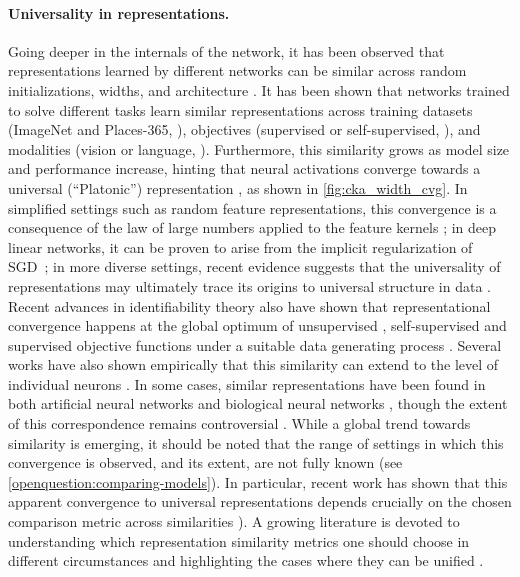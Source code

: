 \paragraph{Universality in representations.} Going deeper in the internals of the network, it has been observed that representations learned by different networks can be similar across random initializations, widths, and architecture \citep{raghu2017svcca,kornblith2019similarity,bansal2021revisiting,huh2024platonic, moschella2022relative}. It has been shown that networks trained to solve different tasks learn similar representations across training datasets (ImageNet and Places-365, \citet{lenc2015understanding}), objectives (supervised or self-supervised, \citep{bansal2021revisiting}), and modalities (vision or language, \citep{huh2024platonic}). Furthermore, this similarity grows as model size and performance increase, hinting that neural activations converge towards a universal (``Platonic'') representation \citep{bansal2021revisiting, huh2024platonic}, as shown in \cref{fig:cka_width_cvg}.
In simplified settings such as random feature representations, this convergence is a consequence of the law of large numbers applied to the feature kernels \citep{rahimi2007random,guth2024rainbow}; in deep linear networks, it can be proven to arise from the implicit regularization of SGD~\citep{ziyin2025proof}; in more diverse settings, recent evidence suggests that the universality of representations may ultimately trace its origins to universal structure in data \citep{huh2024platonic,karkada2026symmetry}. Recent advances in {identifiability theory} \citep{hyvarinen2024identifiability} also have shown that representational convergence happens at the global optimum of unsupervised \citep{klindt2020towards}, self-supervised \citep{zimmermann2021contrastive} and supervised \citep{reizinger2024cross} objective functions under a suitable data generating process \citep{reizinger2025position}.
Several works have also shown empirically that this similarity can extend to the level of individual neurons \citep{li2015convergent,dravid2023rosetta,khosla2024privileged}. In some cases, similar representations have been found in both artificial neural networks and biological neural networks \citep{olshausen1996emergence, yamins2014performance, mcintosh2016deep}, though the extent of this correspondence remains controversial \citep{bowers2023deep}.
While a global trend towards similarity is emerging, it should be noted that the range of settings in which this convergence is observed, and its extent, are not fully known (see \cref{openquestion:comparing-models}).
In particular, recent work has shown that this apparent convergence to universal representations depends crucially on the chosen comparison metric across similarities \citep{groger2026revisiting}). A growing literature is devoted to understanding which representation similarity metrics one should choose in different circumstances \citep{sucholutsky2023getting,klabunde2025similarity} and highlighting the cases where they can be unified \citep{harvey2024duality,williams2024equivalence}.



